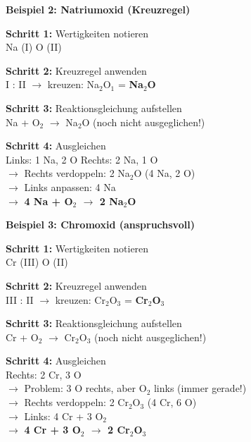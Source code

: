 \documentclass[11pt, a4paper]{article}
\begin{document}
\begin{loesungbox}
\textbf{Beispiel 2: Natriumoxid (Kreuzregel)}

\textbf{Schritt 1:} Wertigkeiten notieren\\
Na (I) \quad O (II)

\textbf{Schritt 2:} Kreuzregel anwenden\\
I : II $\rightarrow$ kreuzen: Na$_2$O$_1$ = \textbf{Na$_2$O}

\textbf{Schritt 3:} Reaktionsgleichung aufstellen\\
Na + O$_2$ $\rightarrow$ Na$_2$O \quad (noch nicht ausgeglichen!)

\textbf{Schritt 4:} Ausgleichen\\
Links: 1 Na, 2 O \quad Rechts: 2 Na, 1 O\\
$\rightarrow$ Rechts verdoppeln: 2 Na$_2$O (4 Na, 2 O)\\
$\rightarrow$ Links anpassen: 4 Na\\
$\rightarrow$ \textbf{4 Na + O$_2$ $\rightarrow$ 2 Na$_2$O}
\end{loesungbox}

\vspace{0.5em}

\begin{loesungbox}
\textbf{Beispiel 3: Chromoxid (anspruchsvoll)}

\textbf{Schritt 1:} Wertigkeiten notieren\\
Cr (III) \quad O (II)

\textbf{Schritt 2:} Kreuzregel anwenden\\
III : II $\rightarrow$ kreuzen: Cr$_2$O$_3$ = \textbf{Cr$_2$O$_3$}

\textbf{Schritt 3:} Reaktionsgleichung aufstellen\\
Cr + O$_2$ $\rightarrow$ Cr$_2$O$_3$ \quad (noch nicht ausgeglichen!)

\textbf{Schritt 4:} Ausgleichen\\
Rechts: 2 Cr, 3 O\\
$\rightarrow$ Problem: 3 O rechts, aber O$_2$ links (immer gerade!)\\
$\rightarrow$ Rechts verdoppeln: 2 Cr$_2$O$_3$ (4 Cr, 6 O)\\
$\rightarrow$ Links: 4 Cr + 3 O$_2$\\
$\rightarrow$ \textbf{4 Cr + 3 O$_2$ $\rightarrow$ 2 Cr$_2$O$_3$}
\end{loesungbox}

\newpage
\end{document}
